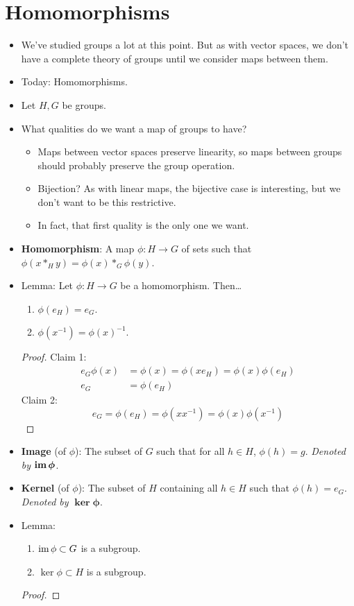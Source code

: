 \documentclass[../notes.tex]{subfiles}
\begin{document}
\section{Homomorphisms}
\begin{itemize}
    \item {}We've studied groups a lot at this point. But as with vector spaces, we don't have a complete theory of groups until we consider maps between them.
    \item Today: Homomorphisms.
    \item Let $H,G$ be groups.
    \item What qualities do we want a map of groups to have?
    \begin{itemize}
        \item Maps between vector spaces preserve linearity, so maps between groups should probably preserve the group operation.
        \item Bijection? As with linear maps, the bijective case is interesting, but we don't want to be this restrictive.
        \item In fact, that first quality is the only one we want.
    \end{itemize}
    \item \textbf{Homomorphism}: A map $\phi:H\to G$ of sets such that $\phi(x*_Hy)=\phi(x)*_G\phi(y)$.
    \item Lemma: Let $\phi:H\to G$ be a homomorphism. Then\dots
    \begin{enumerate}
        \item $\phi(e_H)=e_G$.
        \item $\phi(x^{-1})=\phi(x)^{-1}$.
    \end{enumerate}
    \begin{proof}
        Claim 1:
        \begin{align*}
            e_G\phi(x) &= \phi(x) = \phi(xe_H) = \phi(x)\phi(e_H)\\
            e_G &= \phi(e_H)
        \end{align*}
        Claim 2:
        \begin{equation*}
            e_G = \phi(e_H) = \phi(xx^{-1}) = \phi(x)\phi(x^{-1})
        \end{equation*}
    \end{proof}
    \item \textbf{Image} (of $\phi$): The subset of $G$ such that for all $h\in H$, $\phi(h)=g$. \emph{Denoted by} $\bm{\im\phi}$.
    \item \textbf{Kernel} (of $\phi$): The subset of $H$ containing all $h\in H$ such that $\phi(h)=e_G$. \emph{Denoted by} $\bm{\ker\phi}$.
    \item Lemma:
    \begin{enumerate}
        \item $\operatorname{im}\phi\subset G$ is a subgroup.
        \item $\ker\phi\subset H$ is a subgroup.
    \end{enumerate}
    \begin{proof}



\end{proof}
\end{itemize}
\end{document}

